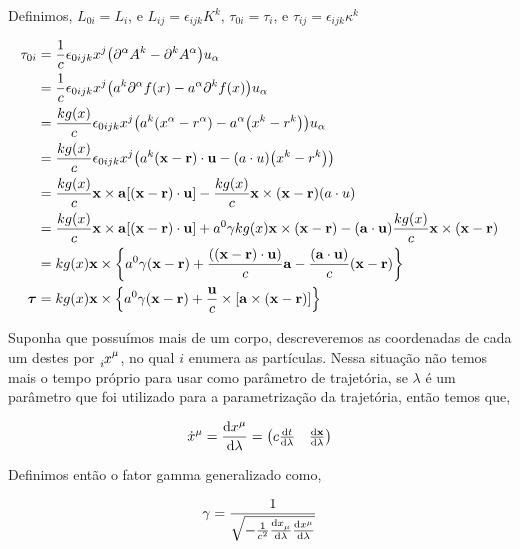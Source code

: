 \documentclass[twoside]{amsart}
\numberwithin{equation}{section}
\begin{document}
Definimos, $L_{0i}=L_i$, e $L_{ij}=\epsilon_{ijk}K^k$, $\tau_{0i}=\tau_i$, e $\tau_{ij}=\epsilon_{ijk}\kappa^k$ 

\begin{align}
    \tau_{0i}&=\frac1c\epsilon_{0ijk}x^j\qty(\partial^\alpha A^k-\partial^k A^\alpha)u_\alpha\\
    &=\frac1c\epsilon_{0ijk}x^j\qty(a^k\partial^\alpha f\qty(x)-a^\alpha\partial^k f\qty(x))u_\alpha\\
    &=\frac{kg\qty(x)}{c}\epsilon_{0ijk}x^j\qty(a^k\qty(x^\alpha-r^\alpha)-a^\alpha\qty(x^k-r^k))u_\alpha\\
    &=\frac{kg\qty(x)}{c}\epsilon_{0ijk}x^j\qty(a^k\qty(\vb x-\vb r)\cdot \vb u-\qty(a\cdot u)\qty(x^k-r^k))\\
    &=\frac{kg\qty(x)}{c}\vb x\times \vb a \qty[\qty(\vb x-\vb r)\cdot \vb u]-\frac{kg\qty(x)}{c}\vb x\times\qty(\vb x-\vb r)\qty(a\cdot u)\\
    &=\frac{kg\qty(x)}{c}\vb x\times \vb a \qty[\qty(\vb x-\vb r)\cdot \vb u]+a^0\gamma kg\qty(x)\vb x\times\qty(\vb x-\vb r)-\qty(\vb a\cdot \vb u)\frac{kg\qty(x)}{c}\vb x\times \qty(\vb x-\vb r)\\
    &=kg\qty(x)\vb x\times\qty{a^0\gamma\qty(\vb x-\vb r)+\frac{\qty(\qty(\vb x-\vb r)\cdot \vb u)}{c}\vb a-\frac{\qty(\vb a\cdot \vb u)}{c}\qty(\vb x -\vb r)}\\
    \boldsymbol \tau&=kg\qty(x)\vb x\times\qty{a^0\gamma\qty(\vb x-\vb r)+\frac{\vb u}{c}\times \qty[\vb a\times\qty(\vb x-\vb r)]}
\end{align}

Suponha que possuímos mais de um corpo, descreveremos as coordenadas de cada um destes por $\tensor[_i]{x}{^\mu}$, no qual $i$ enumera as partículas. Nessa situação não temos mais o tempo próprio para usar como parâmetro de trajetória, se $\lambda$ é um parâmetro que foi utilizado para a parametrização da trajetória, então temos que,

\begin{align}
    \tensor{\dot{x}}{^\mu}=\dv{\tensor{x}{^\mu}}{\lambda}=\mqty(c\dv{t}{\lambda}&\dv{\vb x}{\lambda})
\end{align}

Definimos então o fator gamma generalizado como,

\begin{align}
    \gamma=\frac{1}{\sqrt{-\frac{1}{c^2}\dv{\tensor{x}{_\mu}}{\lambda}\dv{\tensor{x}{^\mu}}{\lambda}}}
\end{align}
\end{document}
